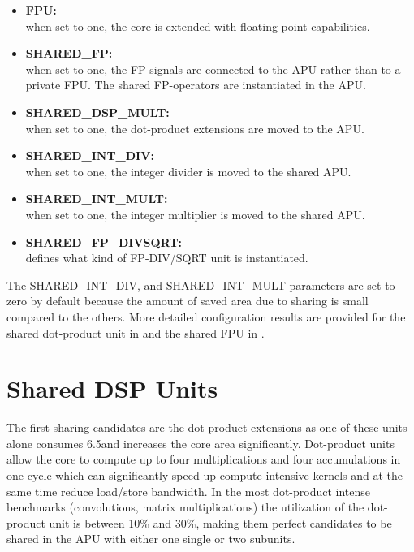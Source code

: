 \documentclass[%
 oneside,      %
 openany,      %
 halfparskip,  %
]{scrbook}
\begin{document}
\begin{itemize}
\item \textbf{FPU:}\\ when set to one, the core is extended with floating-point capabilities.
\item \textbf{SHARED\_FP:}\\ when set to one, the FP-signals are connected to the APU rather than to a private FPU. The shared FP-operators are instantiated in the APU.
\item \textbf{SHARED\_DSP\_MULT:}\\ when set to one, the dot-product extensions are moved to the APU.
\item \textbf{SHARED\_INT\_DIV:}\\ when set to one, the integer divider is moved to the shared APU.
\item \textbf{SHARED\_INT\_MULT:}\\ when set to one, the integer multiplier is moved to the shared APU.
\item \textbf{SHARED\_FP\_DIVSQRT:}\\ defines what kind of FP-DIV/SQRT unit is instantiated.
\end{itemize}

The SHARED\_INT\_DIV, and SHARED\_INT\_MULT parameters are set to zero by default because the amount of saved area due to sharing is small compared to the others. More detailed configuration results are provided for the shared dot-product unit in  and the shared FPU in .

\section{Shared DSP Units}\label{apu_dsp}

The first sharing candidates are the dot-product extensions as one of these units alone consumes 6.5\kGE and increases the core area significantly. Dot-product units allow the core to compute up to four multiplications and four accumulations in one cycle which can significantly speed up compute-intensive kernels and at the same time reduce load/store bandwidth. In the most dot-product intense benchmarks (convolutions, matrix multiplications) the utilization of the dot-product unit is between 10\% and 30\%, making them perfect candidates to be shared in the APU with either one single or two subunits.
\end{document}
